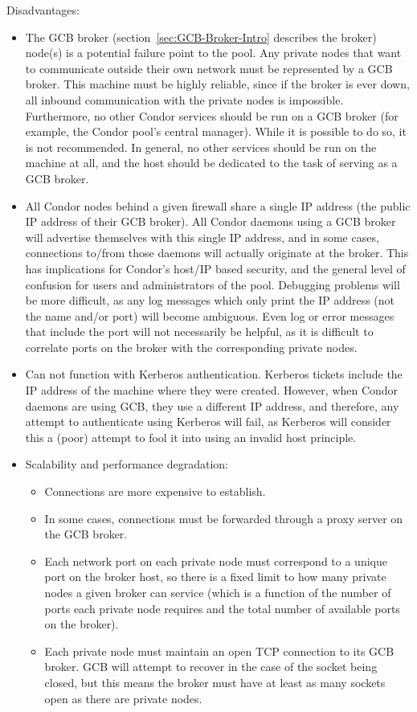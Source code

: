 Disadvantages:
\begin{itemize}

\item The GCB broker 
  (section~\ref{sec:GCB-Broker-Intro} describes the broker)
  node(s) is a potential failure point to the pool.
  Any private nodes that want to communicate outside their own network
  must be represented by a GCB broker.
  This machine must be highly reliable, since if the broker is ever
  down, all inbound communication with the private nodes is
  impossible.
  Furthermore, no other Condor services should be run on a GCB broker
  (for example, the Condor pool's central manager).
  While it is possible to do so, it is not recommended.
  In general, no other services should be run on the machine at all,
  and the host should be dedicated to the task of serving as a GCB
  broker.

\item All Condor nodes behind a given firewall share a single IP
  address (the public IP address of their GCB broker).
  All Condor daemons using a GCB broker will advertise themselves with
  this single IP address, and in some cases, connections to/from those
  daemons will actually originate at the broker.
  This has implications for Condor's host/IP based security,
  and the general level of confusion for users and
  administrators of the pool.
  Debugging problems will be more difficult, as any log messages which 
  only print the IP address (not the name and/or port) will become ambiguous.
  Even log or error messages that include the port will not necessarily
  be helpful, as it is difficult to correlate ports on the broker
  with the corresponding private nodes.
  
\item Can not function with Kerberos authentication.
  Kerberos tickets include the IP address of the machine where they
  were created.
  However, when Condor daemons are using GCB, they use a different IP
  address, and therefore, any attempt to authenticate
  using Kerberos will fail, as Kerberos will consider this a (poor)
  attempt to fool it into using an invalid host principle.

\item Scalability and performance degradation: 
  \begin{itemize}
  \item Connections are more expensive to establish.
  \item In some cases, connections must be forwarded through a proxy
    server on the GCB broker.
  \item Each network port on each private node must correspond to a
    unique port on the broker host, so there is a fixed limit to how
    many private nodes a given broker can service (which is a function
    of the number of ports each private node requires and the total
    number of available ports on the broker).
  \item Each private node must maintain an open TCP connection to its
    GCB broker.  GCB will attempt to recover in the case of the socket
    being closed, but this means the broker must have at least as many
    sockets open as there are private nodes.
  \end{itemize}


\end{itemize}
